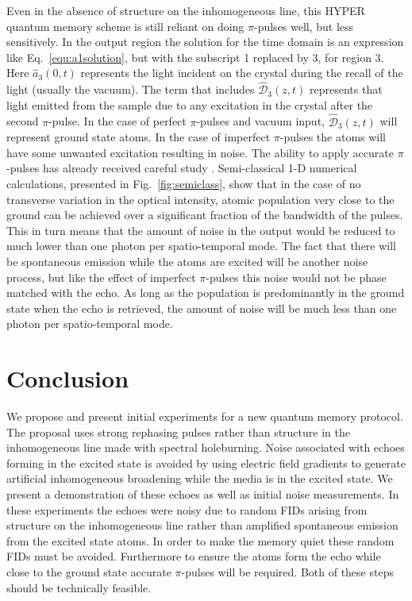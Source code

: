 \documentclass[superscriptaddress,pra,twocolumn,showpacs,amsmath,amssymb,aps,a4paper]{revtex4}
\begin{document}
Even in the absence of structure on the inhomogeneous line, this HYPER quantum
memory scheme is still reliant on doing $\pi$-pulses well, but less
sensitively. In the output region the solution for the time domain is
an expression like Eq.~\ref{equ:a1solution}, but with the subscript 1
replaced by 3, for region 3. Here $\hat{a}_3(0,t)$ represents the
light incident on the crystal during the recall of the light (usually
the vacuum). The term that includes $\mathcal{\hat{D}}_3(z,t)$
represents that light emitted from the sample due to any excitation in
the crystal after the second $\pi$-pulse. In the case of perfect
$\pi$-pulses and vacuum input, $\hat{\mathcal{D}}_3(z,t)$ will
represent ground state atoms. In the case of imperfect $\pi$-pulses
the atoms will have some unwanted excitation resulting in noise. The
ability to apply accurate $\pi$-pulses has already received
careful study \cite{zafa07,rugg10}. Semi-classical 1-D numerical
calculations, presented in Fig.~\ref{fig:semiclass}, show that in the
case of no transverse variation in the optical intensity, atomic population very
close to the ground can be achieved over a significant fraction of the
bandwidth of the pulses. This in turn means that the amount of noise
in the output would be reduced to much lower than one photon per
spatio-temporal mode. The fact that there will be spontaneous emission while the atoms are excited will be another noise process, but like the effect of imperfect $\pi$-pulses this noise would not be phase matched with the echo. As long as the population is predominantly in the ground state when the echo is retrieved, the amount of noise will be much less than one photon per spatio-temporal mode.

\section{Conclusion}

We propose and present initial experiments for a new quantum memory
protocol. The proposal uses strong rephasing pulses rather than
structure in the inhomogeneous line made with spectral
holeburning. Noise associated with echoes forming in the excited state
is avoided by using electric field gradients to generate artificial
inhomogeneous broadening while the media is in the excited state. We
present a demonstration of these echoes as well as initial noise
measurements. In these experiments the echoes were noisy due to random
FIDs arising from structure on the inhomogeneous line rather than
amplified spontaneous emission from the excited state atoms. In order to make
the memory quiet these random FIDs must be avoided. Furthermore to ensure the atoms form the echo while close to the ground state accurate
$\pi$-pulses will be required. Both of these steps should be
technically feasible.
\end{document}
